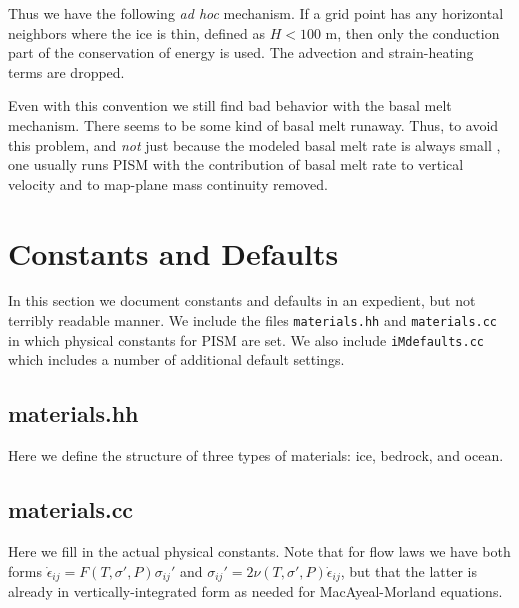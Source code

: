 \documentclass[12pt,final]{amsart}%
\theoremstyle{plain}
\theoremstyle{definition}
\theoremstyle{remark}
\def\eps{\epsilon}
\begin{document}
Thus we have the following \emph{ad hoc} mechanism.  If a grid point has any horizontal neighbors where the ice is thin, defined as $H < 100$ m, then only the conduction part of the conservation of energy is used.  The advection and strain-heating terms are dropped.

Even with this convention we still find bad behavior with the basal melt mechanism.  There seems to be some kind of basal melt runaway.  Thus, to avoid this problem, and \emph{not} just because the modeled basal melt rate is always small \citep[compare the dismissal in][]{EISMINT00}, one usually runs PISM with the contribution of basal melt rate to vertical velocity and to map-plane mass continuity removed.


\section{Constants and Defaults}

In this section we document constants and defaults in an expedient, but not terribly readable manner.  We include the files \texttt{materials.hh} and \texttt{materials.cc} in which physical constants for PISM are set.  We also include \texttt{iMdefaults.cc} which includes a number of additional default settings.

\subsection*{materials.hh}  Here we define the structure of three types of materials: ice, bedrock, and ocean.

\scriptsize
\begin{quote}

\end{quote}
\normalsize

\subsection*{materials.cc}  Here we fill in the actual physical constants.  Note that for flow laws we have both forms $\dot \eps_{ij} = F(T,\sigma',P) \sigma_{ij}'$ and $\sigma_{ij}' = 2 \nu(T,\sigma',P) \dot \eps_{ij}$, but that the latter is already in vertically-integrated form as needed for MacAyeal-Morland equations.

\scriptsize
\begin{quote}

\end{quote}
\normalsize
\end{document}
